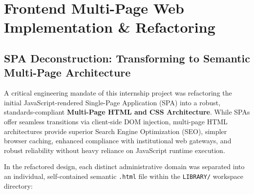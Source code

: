 \documentclass[11pt,a4paper]{report}
\begin{document}
\newpage

\chapter{Frontend Multi-Page Web Implementation \& Refactoring}

\section{SPA Deconstruction: Transforming to Semantic Multi-Page Architecture}
A critical engineering mandate of this internship project was refactoring the initial JavaScript-rendered Single-Page Application (SPA) into a robust, standards-compliant \textbf{Multi-Page HTML and CSS Architecture}. While SPAs offer seamless transitions via client-side DOM injection, multi-page HTML architectures provide superior Search Engine Optimization (SEO), simpler browser caching, enhanced compliance with institutional web gateways, and robust reliability without heavy reliance on JavaScript runtime execution.

In the refactored design, each distinct administrative domain was separated into an individual, self-contained semantic \texttt{.html} file within the \texttt{LIBRARY/} workspace directory:
\end{document}
